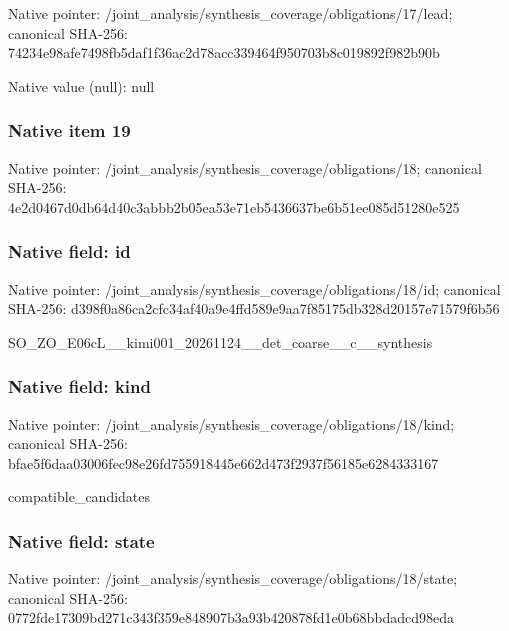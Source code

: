 \documentclass[10pt,a4paper]{article}
\begin{document}
Native pointer: /joint\_analysis/synthesi\allowbreak{}s\_coverage/obligations/1\allowbreak{}7/lead; canonical SHA-256: 74234e98afe7498fb5daf1f3\allowbreak{}6ac2d78acc339464f950703b\allowbreak{}8c019892f982b90b



Native value (null): null



\subsubsection{Native item 19}


Native pointer: /joint\_analysis/synthesi\allowbreak{}s\_coverage/obligations/1\allowbreak{}8; canonical SHA-256: 4e2d0467d0db64d40c3abbb2\allowbreak{}b05ea53e71eb5436637be6b5\allowbreak{}1ee085d51280e525



\subsubsection{Native field: id}


Native pointer: /joint\_analysis/synthesi\allowbreak{}s\_coverage/obligations/1\allowbreak{}8/id; canonical SHA-256: d398f0a86ca2cfc34af40a9e\allowbreak{}4ffd589e9aa7f85175db328d\allowbreak{}20157e71579f6b56


SO\_ZO\_E06cL\_\_kimi001\_202\allowbreak{}61124\_\_det\_coarse\_\_c\_\_sy\allowbreak{}nthesis


\subsubsection{Native field: kind}


Native pointer: /joint\_analysis/synthesi\allowbreak{}s\_coverage/obligations/1\allowbreak{}8/kind; canonical SHA-256: bfae5f6daa03006fec98e26f\allowbreak{}d755918445e662d473f2937f\allowbreak{}56185e6284333167


compatible\_candidates


\subsubsection{Native field: state}


Native pointer: /joint\_analysis/synthesi\allowbreak{}s\_coverage/obligations/1\allowbreak{}8/state; canonical SHA-256: 0772fde17309bd271c343f35\allowbreak{}9e848907b3a93b420878fd1e\allowbreak{}0b68bbdadcd98eda
\end{document}
